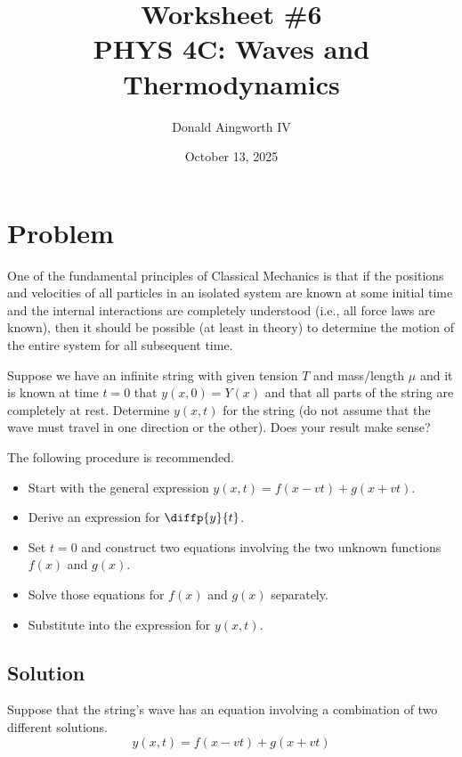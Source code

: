 \documentclass[12pt]{article}
\title{
    Worksheet \#6
    \\  \small
    PHYS 4C: Waves and Thermodynamics
    }
\author{Donald Aingworth IV}
\date{October 13, 2025}
\begin{document}

    \maketitle

    \setcounter{section}{1}
    \section*{Problem}
        One of the fundamental principles of Classical Mechanics is that if the positions and velocities of all particles in an isolated system are known at some initial time and the internal interactions are completely understood (i.e., all force laws are known), then it should be possible (at least in theory) to determine the motion of the entire system for all subsequent time.
        
        Suppose we have an infinite string with given tension $T$ and mass/length $\mu$ and it is known at time $t = 0$ that $y(x,0) = Y(x)$ and that all parts of the string are completely at rest. 
        Determine $y(x,t)$ for the string (do not assume that the wave must travel in one direction or the other). 
        Does your result make sense?
        
        The following procedure is recommended.
        \begin{itemize}
            \item   Start with the general expression $y(x,t) = f(x - vt) + g(x + vt)$.
            \item   Derive an expression for $\diffp{y}{t}$.
            \item   Set $t = 0$ and construct two equations involving the two unknown functions $f(x)$ and $g(x)$.
            \item   Solve those equations for $f(x)$ and $g(x)$ separately.
            \item   Substitute into the expression for $y(x,t)$.
        \end{itemize}

        \subsection*{Solution}
            Suppose that the string's wave has an equation involving a combination of two different solutions.
            \begin{equation}
                y(x,t) = f(x - vt) + g(x + vt)
            \end{equation}
\end{document}
